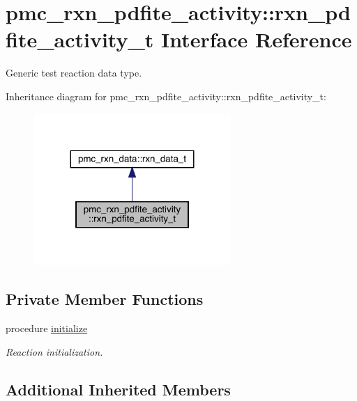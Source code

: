 \hypertarget{structpmc__rxn__pdfite__activity_1_1rxn__pdfite__activity__t}{}\section{pmc\+\_\+rxn\+\_\+pdfite\+\_\+activity\+:\+:rxn\+\_\+pdfite\+\_\+activity\+\_\+t Interface Reference}
\label{structpmc__rxn__pdfite__activity_1_1rxn__pdfite__activity__t}


Generic test reaction data type.  




Inheritance diagram for pmc\+\_\+rxn\+\_\+pdfite\+\_\+activity\+:\+:rxn\+\_\+pdfite\+\_\+activity\+\_\+t\+:\nopagebreak
\begin{figure}[H]
\begin{center}
\leavevmode
\includegraphics[width=212pt]{structpmc__rxn__pdfite__activity_1_1rxn__pdfite__activity__t__inherit__graph}
\end{center}
\end{figure}
\subsection*{Private Member Functions}
\begin{DoxyCompactItemize}
\item 
procedure \mbox{\hyperlink{structpmc__rxn__pdfite__activity_1_1rxn__pdfite__activity__t_a92d2989cacc3f2cdb22b8296bf069f9e}{initialize}}
\begin{DoxyCompactList}\small\item\em Reaction initialization. \end{DoxyCompactList}\end{DoxyCompactItemize}
\subsection*{Additional Inherited Members}


